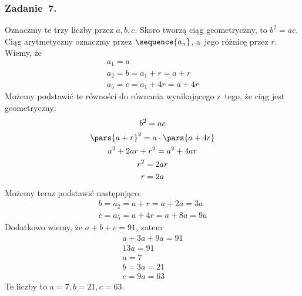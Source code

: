 \subsubsection*{Zadanie~7.}
Oznaczmy te trzy liczby przez \(a, b, c\). Skoro tworzą ciąg geometryczny, to \(b^2 = ac\). Ciąg arytmetyczny oznaczmy przez \(\sequence{a_n}\), a~jego różnicę przez \(r\). Wiemy, że
\begin{gather*}
    a_1 = a\\
    a_2 = b = a_1 + r = a + r\\
    a_5 = c = a_1 + 4r = a + 4r
\end{gather*}
Możemy podstawić te równości do równania wynikającego z~tego, że ciąg jest geometryczny:
\begin{gather*}
    b^2 = ac\\
    \pars{a + r}^2 = a \cdot \pars{a + 4r}\\
    a^2 + 2ar + r^2 = a^2 + 4ar\\
    r^2 = 2ar\\
    r = 2a
\end{gather*}
Możemy teraz podstawić następująco:
\begin{gather*}
    b = a_2 = a + r = a + 2a = 3a\\
    c = a_5 = a + 4r = a + 8a = 9a
\end{gather*}
Dodatkowo wiemy, że \(a + b + c = 91\), zatem
\begin{gather*}
    a + 3a + 9a = 91\\
    13a = 91\\
    a = 7\\
    b = 3a = 21\\
    c = 9a = 63
\end{gather*}
Te liczby to \(a = 7, b = 21, c = 63\).
